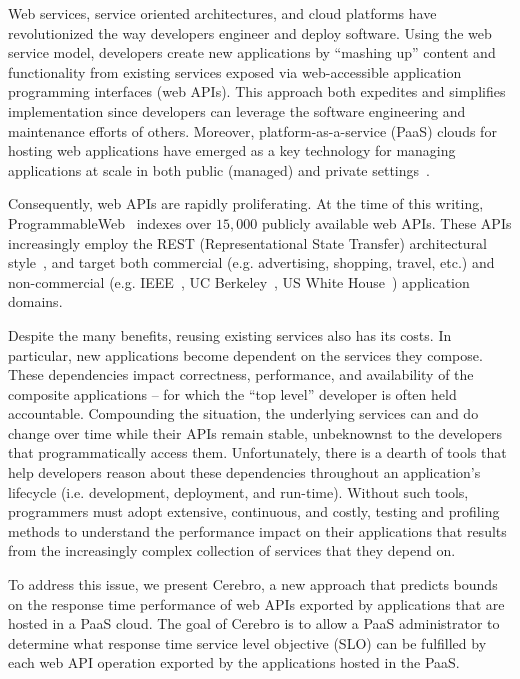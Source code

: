 Web services, service oriented architectures, and cloud platforms have
revolutionized the way developers engineer and deploy software.
Using the web service model, developers create new applications
by ``mashing up'' content and functionality 
from existing services 
exposed via web-accessible application programming interfaces (web APIs).
This approach both expedites and simplifies implementation since 
developers can leverage the 
software engineering and maintenance efforts of others.
Moreover, platform-as-a-service (PaaS) clouds
for hosting web applications have emerged as a key
technology for managing applications at scale in both public (managed) and 
private settings~\cite{paas-growth}.  

Consequently, web APIs are rapidly 
proliferating.  At the time of this writing, 
ProgrammableWeb~\cite{pweb} indexes over $15,000$
publicly available web APIs.
These APIs increasingly employ the REST (Representational State Transfer) 
architectural style~\cite{Fielding:2000:ASD:932295}, and target both
commercial (e.g. advertising, shopping, travel, etc.) and non-commercial
(e.g. IEEE~\cite{ieeeapis}, UC Berkeley~\cite{ucbapis}, US White
House~\cite{whitehouseapis}) application domains.

Despite the many benefits, reusing existing services also has its costs.  
In particular, new applications become dependent on the 
services they compose.  These dependencies
impact correctness, performance, and availability of the composite 
applications -- for which the ``top level'' developer is often held accountable.  
Compounding the situation, the underlying services can and do change over time
while their APIs remain stable,
unbeknownst to the developers that programmatically access them.
Unfortunately, there is a dearth of tools that help developers reason about these 
dependencies throughout an application's 
lifecycle (i.e. development, deployment, and run-time).  Without such tools, 
programmers must adopt extensive, continuous, and costly, testing and profiling methods
to understand the performance impact on their applications
that results from the increasingly complex collection of
services that they depend on.

To address this issue, we present Cerebro, a new approach that
predicts bounds on 
the response time performance of web
APIs exported by applications that are hosted in a PaaS cloud.
The goal of Cerebro is to allow 
a PaaS administrator to determine what response time service level objective (SLO) can be
fulfilled by each web API operation exported by the applications
hosted in the PaaS.  

